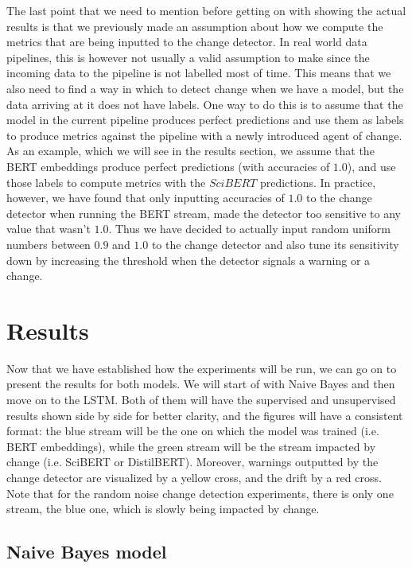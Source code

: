 \documentclass[12pt]{extreport}
\begin{document}
The last point that we need to mention before getting on with showing the actual results is that we previously made an assumption about how we compute the metrics that are being inputted to the change detector. In real world data pipelines, this is however not usually a valid assumption to make since the incoming data to the pipeline is not labelled most of time. This means that we also need to find a way in which to detect change when we have a model, but the data arriving at it does not have labels. One way to do this is to assume that the model in the current pipeline produces perfect predictions and use them as labels to produce metrics against the pipeline with a newly introduced agent of change. As an example, which we will see in the results section, we assume that the BERT embeddings produce perfect predictions (with accuracies of $1.0$), and use those labels to compute metrics with the $SciBERT$ predictions. In practice, however, we have found that only inputting accuracies of $1.0$ to the change detector when running the BERT stream, made the detector too sensitive to any value that wasn't $1.0$. Thus we have decided to actually input random uniform numbers between $0.9$ and $1.0$ to the change detector and also tune its sensitivity down by increasing the threshold when the detector signals a warning or a change.

\newpage

\section{Results}

Now that we have established how the experiments will be run, we can go on to present the results for both models. We will start of with Naive Bayes and then move on to the LSTM. Both of them will have the supervised and unsupervised results shown side by side for better clarity, and the figures will have a consistent format: the blue stream will be the one on which the model was trained (i.e. BERT embeddings), while the green stream will be the stream impacted by change (i.e. SciBERT or DistilBERT). Moreover, warnings outputted by the change detector are visualized by a yellow cross, and the drift by a red cross. Note that for the random noise change detection experiments, there is only one stream, the blue one, which is slowly being impacted by change.

\subsection{Naive Bayes model}
\end{document}
